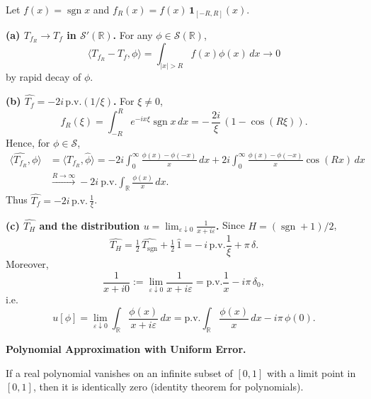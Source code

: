 \begin{solution}
Let $f(x)=\operatorname{sgn}x$ and $f_R(x)=f(x)\,\mathbf 1_{[-R,R]}(x)$.

\par\medskip\noindent\textbf{(a) $T_{f_R}\to T_f$ in $\mathcal S'(\mathbb R)$.}\quad
For any $\phi\in\mathcal S(\mathbb R)$,
\[
\langle T_{f_R}-T_f,\phi\rangle
=\int_{|x|>R} f(x)\phi(x)\,dx \longrightarrow 0
\]
by rapid decay of $\phi$.

\smallskip

\par\medskip\noindent\textbf{(b) $\widehat{T_f}=-2i\,\mathrm{p.v.}(1/\xi)$.}\quad
For $\xi\neq0$,
\[
\widehat{f_R}(\xi)=\int_{-R}^R e^{-ix\xi}\operatorname{sgn}x\,dx
=-\,\frac{2i}{\xi}\,(1-\cos(R\xi)).
\]
Hence, for $\phi\in\mathcal S$,
\begin{align*}
	\langle \widehat{T_{f_R}},\phi\rangle
	&=\langle T_{f_R},\widehat\phi\rangle
	= -2i \int_0^\infty \frac{\phi(x)-\phi(-x)}{x}\,dx
	+2i \int_0^\infty \frac{\phi(x)-\phi(-x)}{x}\cos(Rx)\,dx \\
	&\xrightarrow{R\to\infty} -2i\ \mathrm{p.v.}\!\int_{\mathbb R}\frac{\phi(x)}{x}\,dx.
\end{align*}
Thus $\widehat{T_f}=-2i\,\mathrm{p.v.}\,\frac{1}{\xi}$.

\smallskip

\par\medskip\noindent\textbf{(c) $\widehat{T_H}$ and the distribution $u=\lim_{\varepsilon\downarrow0}\frac{1}{x+i\varepsilon}$.}\quad
Since $H=(\operatorname{sgn}+1)/2$,
\[
\widehat{T_H}
=\tfrac12\,\widehat{T_{\operatorname{sgn}}}+\tfrac12\,\widehat{1}
= -\,i\,\mathrm{p.v.}\!\frac{1}{\xi} + \pi\,\delta.
\]
Moreover,
\[
\frac{1}{x+i0}:=\lim_{\varepsilon\downarrow0}\frac{1}{x+i\varepsilon}
= \mathrm{p.v.}\!\frac{1}{x} - i\pi\,\delta_0,
\]
i.e.
\[
u[\phi]=\lim_{\varepsilon\downarrow0}\int_{\mathbb R}\frac{\phi(x)}{x+i\varepsilon}\,dx
= \mathrm{p.v.}\!\int_{\mathbb R}\frac{\phi(x)}{x}\,dx - i\pi\,\phi(0).
\]

\bigskip
\bigskip
\end{solution}

\begin{problem}[CP-II-0284]
\label{prob:cp-ii-0284}
\textbf{Polynomial Approximation with Uniform Error.}

\hspace*{1.5em}If a real polynomial vanishes on an infinite subset of $[0,1]$ with a limit point in $[0,1]$,
	then it is identically zero (identity theorem for polynomials).
\end{problem}

